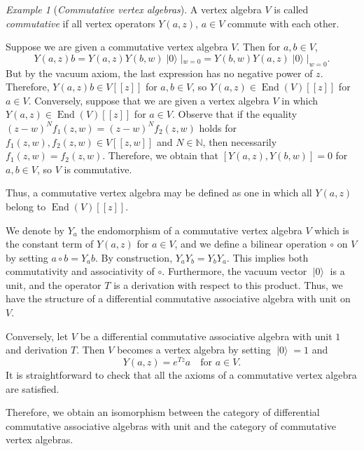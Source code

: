 \documentclass[a4paper, 12pt, reqno]{amsart}
\theoremstyle{remark}
\newtheorem{example}[theorem]{Example}
\DeclareMathOperator{\End}{End}
\DeclareMathOperator{\vac}{|0\rangle}
\begin{document}
\begin{example}[\emph{Commutative vertex algebras}]
  \label{exa:4}
  A vertex algebra $V$ is called \emph{commutative} if all vertex operators $Y(a, z)$, $a \in V$ commute with each other.

  Suppose we are given a commutative vertex algebra $V$.
  Then for $a, b \in V$,
  \begin{equation*}
    Y(a, z)b = Y(a, z)Y(b, w)\vac|_{w = 0} = Y(b, w)Y(a, z)\vac|_{w = 0}.
  \end{equation*}
  But by the vacuum axiom, the last expression has no negative power of $z$.
  Therefore, $Y(a, z)b \in V[[z]]$ for $a, b \in V$, so $Y(a, z) \in \End(V)[[z]]$ for $a \in V$.
  Conversely, suppose that we are given a vertex algebra $V$ in which $Y(a, z) \in \End(V)[[z]]$ for $a \in V$.
  Observe that if the equality $(z - w)^Nf_1(z, w) = (z - w)^Nf_2(z, w)$ holds for $f_1(z, w), f_2(z, w) \in V[[z, w]]$ and $N \in \mathbb{N}$, then necessarily $f_1(z, w) = f_2(z, w)$.
  Therefore, we obtain that $[Y(a, z), Y(b, w)] = 0$ for $a, b \in V$, so $V$ is commutative.

  Thus, a commutative vertex algebra may be defined as one in which all $Y(a, z)$ belong to $\End(V)[[z]]$.

  We denote by $Y_a$ the endomorphism of a commutative vertex algebra $V$ which is the constant term of $Y(a, z)$ for $a \in V$, and we define a bilinear operation $\circ$ on $V$ by setting $a\circ b = Y_ab$.
  By construction, $Y_aY_b = Y_bY_a$.
  This implies both commutativity and associativity of $\circ$.
  Furthermore, the vacuum vector $\vac$ is a unit, and the operator $T$ is a derivation with respect to this product.
  Thus, we have the structure of a differential commutative associative algebra with unit on $V$.

  Conversely, let $V$ be a differential commutative associative algebra with unit $1$ and derivation $T$.
  Then $V$ becomes a vertex algebra by setting $\vac = 1$ and
  \begin{equation*}
    Y(a, z) = e^{Tz}a \quad \text{for $a \in V$}.
  \end{equation*}
  It is straightforward to check that all the axioms of a commutative vertex algebra are satisfied.

  Therefore, we obtain an isomorphism between the category of differential commutative associative algebras with unit and the category of commutative vertex algebras.
\end{example}
\end{document}
